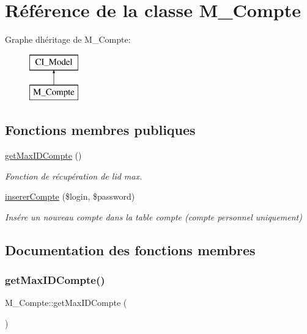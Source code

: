 \hypertarget{class_m___compte}{}\section{Référence de la classe M\+\_\+\+Compte}
\label{class_m___compte}
Graphe d\textquotesingle{}héritage de M\+\_\+\+Compte\+:\begin{figure}[H]
\begin{center}
\leavevmode
\includegraphics[height=2.000000cm]{class_m___compte}
\end{center}
\end{figure}
\subsection*{Fonctions membres publiques}
\begin{DoxyCompactItemize}
\item 
\hyperlink{class_m___compte_a4ccf3c1a24a03fa028a5779e722fc8ea}{get\+Max\+I\+D\+Compte} ()
\begin{DoxyCompactList}\small\item\em Fonction de récupération de l\textquotesingle{}id max. \end{DoxyCompactList}\item 
\hyperlink{class_m___compte_a5d79fa3a8e2ef0214c8de9bc19127499}{inserer\+Compte} (\$login, \$password)
\begin{DoxyCompactList}\small\item\em Insére un nouveau compte dans la table compte (compte personnel uniquement) \end{DoxyCompactList}\end{DoxyCompactItemize}


\subsection{Documentation des fonctions membres}
\mbox{\label{class_m___compte_a4ccf3c1a24a03fa028a5779e722fc8ea}} 
\subsubsection{\texorpdfstring{get\+Max\+I\+D\+Compte()}{getMaxIDCompte()}}
{\footnotesize\ttfamily M\+\_\+\+Compte\+::get\+Max\+I\+D\+Compte (\begin{DoxyParamCaption}{ }\end{DoxyParamCaption})}



